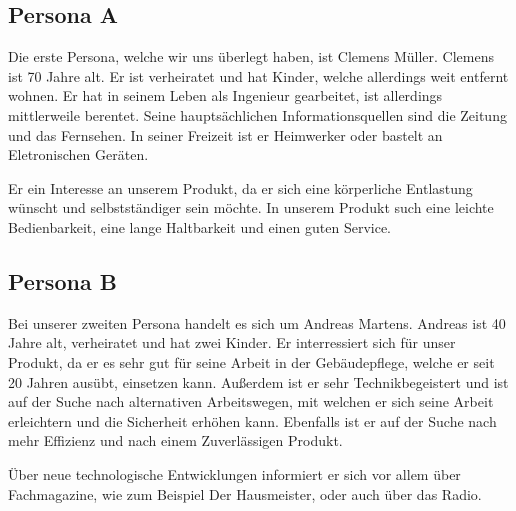 \subsection{Persona A} \label{personaA}
    Die erste Persona, welche wir uns überlegt haben, ist Clemens Müller. Clemens ist 70 Jahre alt. Er ist verheiratet 
    und hat Kinder, welche allerdings weit entfernt wohnen. Er hat in seinem Leben als Ingenieur gearbeitet, ist 
    allerdings mittlerweile berentet. Seine hauptsächlichen Informationsquellen sind die Zeitung und das Fernsehen. In 
    seiner Freizeit ist er Heimwerker oder bastelt an Eletronischen Geräten. 

    Er ein Interesse an unserem Produkt, da er sich eine körperliche Entlastung wünscht und selbstständiger sein möchte.
    In unserem Produkt such eine leichte Bedienbarkeit, eine lange Haltbarkeit und einen guten Service.

\subsection{Persona B} \label{personaB}
    Bei unserer zweiten Persona handelt es sich um Andreas Martens. Andreas ist 40 Jahre alt, verheiratet und hat zwei 
    Kinder. Er interressiert sich für unser Produkt, da er es sehr gut für seine Arbeit in der Gebäudepflege, welche er 
    seit 20 Jahren ausübt, einsetzen kann. Außerdem ist er sehr Technikbegeistert und ist auf der Suche nach 
    alternativen Arbeitswegen, mit welchen er sich seine Arbeit erleichtern und die Sicherheit erhöhen kann. Ebenfalls 
    ist er auf der Suche nach mehr Effizienz und nach einem Zuverlässigen Produkt.

    Über neue technologische Entwicklungen informiert er sich vor allem über Fachmagazine, wie zum Beispiel \as Der
    Hausmeister\adl, oder auch über das Radio.
